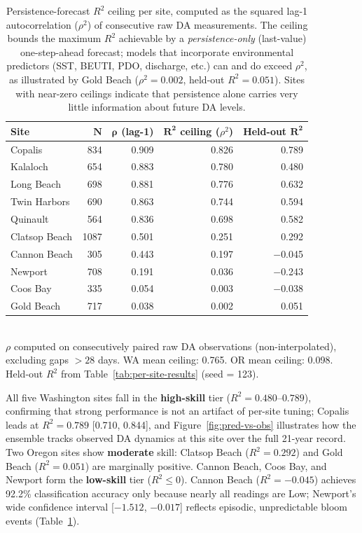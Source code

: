 \documentclass[toxins,article,submit,moreauthors]{Definitions/mdpi}
\begin{document}
\begin{table}[H]
\caption{Persistence-forecast $R^2$ ceiling per site, computed as the squared lag-1 autocorrelation ($\rho^2$) of consecutive raw DA measurements. The ceiling bounds the maximum $R^2$ achievable by a \emph{persistence-only} (last-value) one-step-ahead forecast; models that incorporate environmental predictors (SST, BEUTI, PDO, discharge, etc.) can and do exceed $\rho^2$, as illustrated by Gold Beach ($\rho^2 = 0.002$, held-out $R^2 = 0.051$). Sites with near-zero ceilings indicate that persistence alone carries very little information about future DA levels.}
\label{tab:predictability-ceiling}
\centering\small
\begin{tabular*}{\linewidth}{@{\extracolsep{\fill}}lrrrr}
\toprule
\textbf{Site} & $\boldsymbol{N}$ & $\boldsymbol{\rho}$ \textbf{(lag-1)} & $\boldsymbol{R^2}$ \textbf{ceiling} ($\rho^2$) & \textbf{Held-out} $\boldsymbol{R^2}$ \\
\midrule
Copalis       & 834 & 0.909 & 0.826 & 0.789 \\
Kalaloch      & 654 & 0.883 & 0.780 & 0.480 \\
Long Beach    & 698 & 0.881 & 0.776 & 0.632 \\
Twin Harbors  & 690 & 0.863 & 0.744 & 0.594 \\
Quinault      & 564 & 0.836 & 0.698 & 0.582 \\
\addlinespace
Clatsop Beach & 1087 & 0.501 & 0.251 & 0.292 \\
Cannon Beach  &  305 & 0.443 & 0.197 & $-$0.045 \\
Newport       &  708 & 0.191 & 0.036 & $-$0.243 \\
Coos Bay      &  335 & 0.054 & 0.003 & $-$0.038 \\
Gold Beach    &  717 & 0.038 & 0.002 & 0.051 \\
\bottomrule
\end{tabular*}
\vspace{0.3em}\\
\footnotesize{$\rho$ computed on consecutively paired raw DA observations (non-interpolated), excluding gaps $> 28$ days. WA mean ceiling: 0.765. OR mean ceiling: 0.098. Held-out $R^2$ from Table~\ref{tab:per-site-results} (seed = 123).}
\end{table}

All five Washington sites fall in the \textbf{high-skill} tier ($R^2 = 0.480$--$0.789$), confirming that strong performance is not an artifact of per-site tuning; Copalis leads at $R^2 = 0.789$ [0.710, 0.844], and Figure~\ref{fig:pred-vs-obs} illustrates how the ensemble tracks observed DA dynamics at this site over the full 21-year record. Two Oregon sites show \textbf{moderate} skill: Clatsop Beach ($R^2 = 0.292$) and Gold Beach ($R^2 = 0.051$) are marginally positive. Cannon Beach, Coos Bay, and Newport form the \textbf{low-skill} tier ($R^2 \leq 0$). Cannon Beach ($R^2 = -0.045$) achieves 92.2\% classification accuracy only because nearly all readings are Low; Newport's wide confidence interval [$-1.512$, $-0.017$] reflects episodic, unpredictable bloom events (Table~\ref{tab:predictability-ceiling}).
\end{document}
